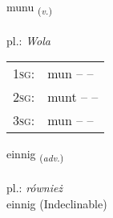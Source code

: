 \documentclass[frontgrid, backgrid]{flacards}\usepackage[]{graphicx}\usepackage[]{xcolor}
\begin{document}
{munu \small{\textsubscript{(\textit{v.})}} \\[1ex] %
\textphonetic{[mʏːnʏ]} \\
pl.: \emph{Wola} \\  [2ex]
\renewcommand*{\arraystretch}{0.8}
\begin{tabular}{p{1cm}l}
\textsc{1sg}: & mun --  --  \\ 
\textsc{2sg}: & munt --  --  \\ 
\textsc{3sg}: & mun --  --  \\ 
\end{tabular}
}


\renewcommand{\flhead}{\vskip5pt \fboxsep=0pt {\small\bfseries\footnotesize Atviksorð | Adverb}}
\renewcommand{\fcfoot}{\vskip5pt \fboxsep=0pt \hspace{2pt}{\small\bfseries\footnotesize 1K}}

\renewcommand{\blhead}{\vskip5pt {\small\bfseries\footnotesize Atviksorð | Adverb }}
\renewcommand{\bcfoot}{\vskip5pt \hspace{2pt}{\small\bfseries\footnotesize 1K}}


{einnig \small{\textsubscript{(\textit{adv.})}} \\[1ex]
\textphonetic{[eitnɪɣ]} \\
pl.: \emph{również} \\  [2ex]
einnig (Indeclinable)}

\renewcommand{\flhead}{\vskip5pt \fboxsep=0pt {\small\bfseries\footnotesize Nafnorð | Noun}}
\renewcommand{\fcfoot}{\vskip5pt \fboxsep=0pt \hspace{2pt}{\small\bfseries\footnotesize 1K}}

\renewcommand{\blhead}{\vskip5pt {\small\bfseries\footnotesize Nafnorð | Noun }}
\renewcommand{\bcfoot}{\vskip5pt \hspace{2pt}{\small\bfseries\footnotesize 1K}}
\end{document}
